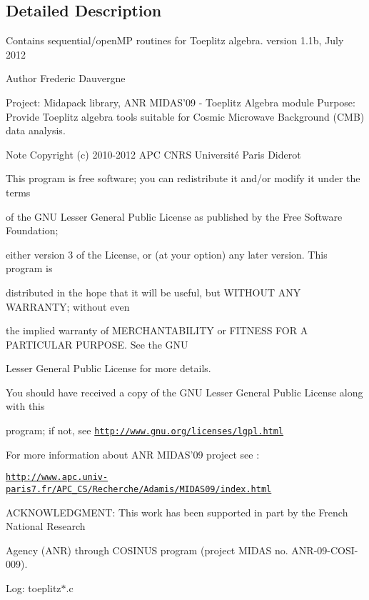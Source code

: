 \subsection{Detailed Description}
Contains sequential/open\-M\-P routines for Toeplitz algebra. version 1.\-1b, July 2012 \begin{DoxyAuthor}{Author}
Frederic Dauvergne
\end{DoxyAuthor}
Project\-: Midapack library, A\-N\-R M\-I\-D\-A\-S'09 -\/ Toeplitz Algebra module Purpose\-: Provide Toeplitz algebra tools suitable for Cosmic Microwave Background (C\-M\-B) data analysis.

\begin{DoxyNote}{Note}
Copyright (c) 2010-\/2012 A\-P\-C C\-N\-R\-S Université Paris Diderot 



This program is free software; you can redistribute it and/or modify it under the terms 

of the G\-N\-U Lesser General Public License as published by the Free Software Foundation; 

either version 3 of the License, or (at your option) any later version. This program is 

distributed in the hope that it will be useful, but W\-I\-T\-H\-O\-U\-T A\-N\-Y W\-A\-R\-R\-A\-N\-T\-Y; without even 

the implied warranty of M\-E\-R\-C\-H\-A\-N\-T\-A\-B\-I\-L\-I\-T\-Y or F\-I\-T\-N\-E\-S\-S F\-O\-R A P\-A\-R\-T\-I\-C\-U\-L\-A\-R P\-U\-R\-P\-O\-S\-E. See the G\-N\-U 

Lesser General Public License for more details. 



You should have received a copy of the G\-N\-U Lesser General Public License along with this 

program; if not, see \href{http://www.gnu.org/licenses/lgpl.html}{\tt http\-://www.\-gnu.\-org/licenses/lgpl.\-html} 

For more information about A\-N\-R M\-I\-D\-A\-S'09 project see \-: 

\href{http://www.apc.univ-paris7.fr/APC_CS/Recherche/Adamis/MIDAS09/index.html}{\tt http\-://www.\-apc.\-univ-\/paris7.\-fr/\-A\-P\-C\-\_\-\-C\-S/\-Recherche/\-Adamis/\-M\-I\-D\-A\-S09/index.\-html} 

A\-C\-K\-N\-O\-W\-L\-E\-D\-G\-M\-E\-N\-T\-: This work has been supported in part by the French National Research 

Agency (A\-N\-R) through C\-O\-S\-I\-N\-U\-S program (project M\-I\-D\-A\-S no. A\-N\-R-\/09-\/\-C\-O\-S\-I-\/009).
\end{DoxyNote}
Log\-: toeplitz$\ast$.c

